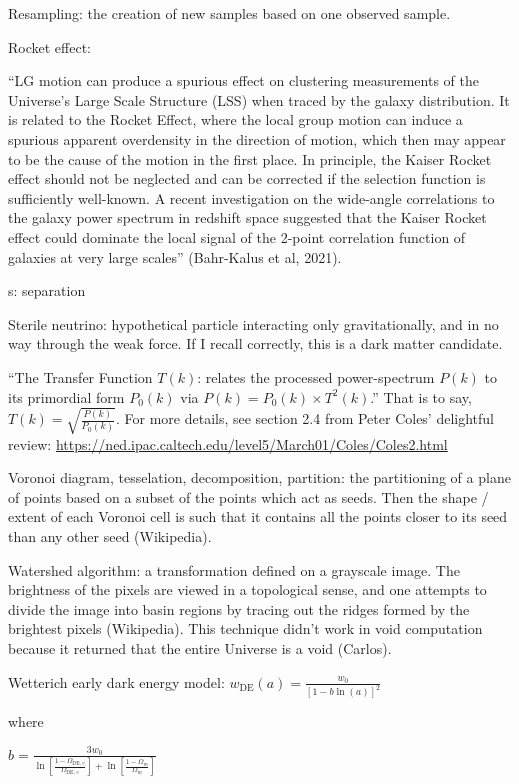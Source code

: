 \documentclass[11pt]{article}
\begin{document}
Resampling: the creation of new samples based on one observed sample.

Rocket effect:

``LG motion can produce a spurious effect on clustering measurements of the
Universe’s Large Scale Structure (LSS) when traced by the galaxy distribution.
It is related to the Rocket Effect, where the local group motion can induce a
spurious apparent overdensity in the direction of motion, which then may appear
to be the cause of the motion in the first place. In principle, the Kaiser
Rocket effect should not be neglected and can be corrected if the selection
function is sufficiently well-known. A recent investigation on the wide-angle
correlations to the galaxy power spectrum in redshift space suggested that the
Kaiser Rocket effect could dominate the local signal of the 2-point correlation
function of galaxies at very large scales'' (Bahr-Kalus et al, 2021).

s: separation

Sterile neutrino: hypothetical particle interacting only gravitationally, and
in no way through the weak force. If I recall correctly, this is a dark matter
candidate.

``The Transfer Function $T(k)$: relates the processed power-spectrum $P(k)$ to
its primordial form $P_0(k)$ via $P(k) = P_0(k) \times T^2(k)$.'' That is to
say, $T(k) = \sqrt{\frac{P(k)}{P_0(k)}}$. For more details, see section 2.4
from Peter Coles' delightful review:
\url{https://ned.ipac.caltech.edu/level5/March01/Coles/Coles2.html}

Voronoi diagram, tesselation, decomposition, partition: the partitioning of a
plane of points based on a subset of the points which act as seeds. Then the
shape / extent of each Voronoi cell is such that it contains all the points
closer to its seed than any other seed (Wikipedia).

Watershed algorithm: a transformation defined on a grayscale image. The
brightness of the pixels are viewed in a topological sense, and one attempts
to divide the image into basin regions by tracing out the ridges formed by
the brightest pixels (Wikipedia). This technique didn't work in void
computation because it returned that the entire Universe is a void (Carlos).

Wetterich early dark energy model:
$w_\text{DE} (a) = \frac{w_0}{[1 - b \ln(a) ]^2}$

where

$
b = \frac{3w_0}{
\ln \left[ \frac{1 - \Omega_\text{DE, e}}{\Omega_\text{DE, e}} \right]
+
\ln \left[ \frac{1 - \Omega_m}{\Omega_m} \right]}
$
\end{document}
